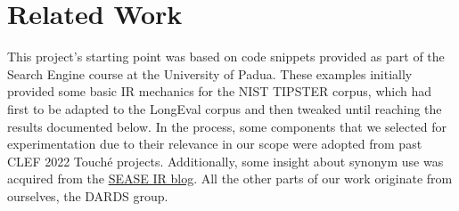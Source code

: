 \section{Related Work}
\label{sec:related}


This project's starting point was based on code snippets provided as part of the Search Engine course at the University of Padua. These examples initially provided some basic IR mechanics for the NIST TIPSTER corpus, which had first to be adapted to the LongEval corpus and then tweaked until reaching the results documented below.
In the process, some components that we selected for experimentation due to their relevance in our scope were adopted from past CLEF 2022 Touché projects. Additionally, some insight about synonym use was acquired from the \href{https://sease.io/our-blog}{SEASE IR blog}.
All the other parts of our work originate from ourselves, the DARDS group.




